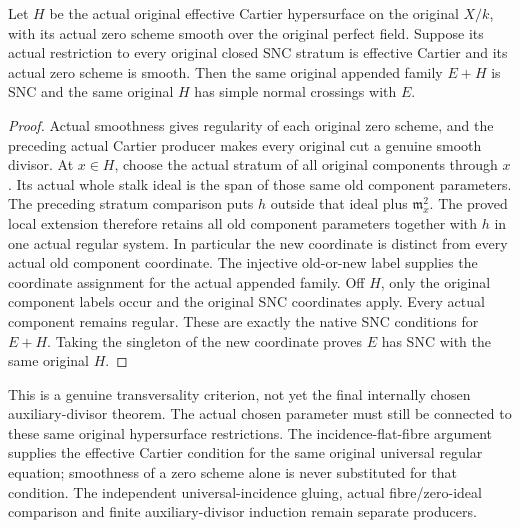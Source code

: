 \begin{theorem}
\label{thm:kn-nadel-bertini-snc-criterion}
\leanok
Let $H$ be the actual original effective Cartier hypersurface on the
original $X/k$, with its actual zero scheme smooth over the original
perfect field.  Suppose its actual restriction to every original closed
SNC stratum is effective Cartier and its actual zero scheme is smooth.
Then the same original appended family $E+H$ is SNC and the same original
$H$ has simple normal crossings with $E$.
\end{theorem}
\begin{proof}
Actual smoothness gives regularity of each original zero scheme, and the
preceding actual Cartier producer makes every original cut a genuine
smooth divisor.  At $x\in H$, choose the actual stratum of all original
components through $x$.  Its actual whole stalk ideal is the span of
those same old component parameters.  The preceding stratum comparison
puts $h$ outside that ideal plus $\mathfrak m_x^2$.  The proved local
extension therefore retains all old component parameters together with
$h$ in one actual regular system.  In particular the new coordinate is
distinct from every actual old component coordinate.  The injective
old-or-new label supplies the coordinate assignment for the actual
appended family.  Off $H$, only the original component labels occur and
the original SNC coordinates apply.  Every actual component remains
regular.  These are exactly the native SNC conditions for $E+H$.
Taking the singleton of the new coordinate proves $E$ has SNC with the
same original $H$.
\end{proof}

This is a genuine transversality criterion, not yet the final internally
chosen auxiliary-divisor theorem.  The actual chosen parameter must
still be connected to these same original hypersurface restrictions.
The incidence-flat-fibre argument supplies the effective Cartier
condition for the same original universal regular equation; smoothness
of a zero scheme alone is never substituted for that condition.  The
independent universal-incidence gluing, actual fibre/zero-ideal comparison
and finite auxiliary-divisor induction remain separate producers.


